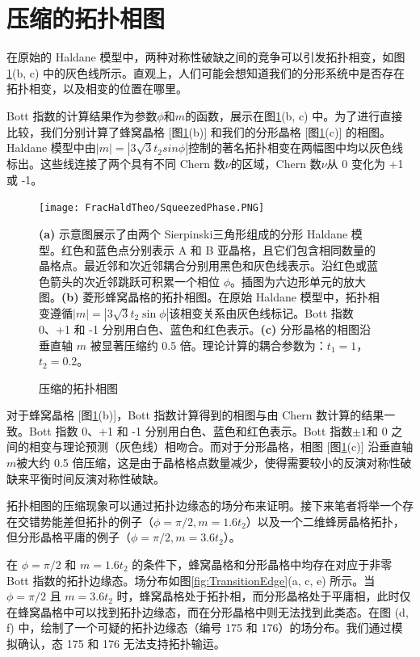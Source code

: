 \section{压缩的拓扑相图}
在原始的 Haldane 模型中，两种对称性破缺之间的竞争可以引发拓扑相变，如图 \ref{fig:SqueezedPhase}(b, c) 中的灰色线所示。直观上，人们可能会想知道我们的分形系统中是否存在拓扑相变，以及相变的位置在哪里。

Bott 指数的计算结果作为参数$\phi$和$m$的函数，展示在图\ref{fig:SqueezedPhase}(b, c) 中。为了进行直接比较，我们分别计算了蜂窝晶格 [图\ref{fig:SqueezedPhase}(b)] 和我们的分形晶格 [图\ref{fig:SqueezedPhase}(c)] 的相图。Haldane 模型中由$|m|=|3\sqrt{3}t_2sin\phi|$控制的著名拓扑相变在两幅图中均以灰色线标出。这些线连接了两个具有不同 Chern 数$\nu$的区域，Chern 数$\nu$从 0 变化为 +1 或 -1。

\begin{figure}[htbp]
    \centering
    \texttt{[image: FracHaldTheo/SqueezedPhase.PNG]}
    \caption{压缩的拓扑相图}\textbf{(a)} 示意图展示了由两个 Sierpinski三角形组成的分形 Haldane 模型。红色和蓝色点分别表示 A 和 B 亚晶格，且它们包含相同数量的晶格点。最近邻和次近邻耦合分别用黑色和灰色线表示。沿红色或蓝色箭头的次近邻跳跃可积累一个相位 $\phi$。插图为六边形单元的放大图。\textbf{(b)} 菱形蜂窝晶格的拓扑相图。在原始 Haldane 模型中，拓扑相变遵循$|m| = |3\sqrt{3} t_2 \sin \phi|$该相变关系由灰色线标记。Bott 指数 0、+1 和 -1 分别用白色、蓝色和红色表示。\textbf{(c)} 分形晶格的相图沿垂直轴 $m$ 被显著压缩约 0.5 倍。理论计算的耦合参数为：$t_1 = 1$，$t_2 = 0.2$。
    \label{fig:SqueezedPhase}
\end{figure}

对于蜂窝晶格 [图\ref{fig:SqueezedPhase}(b)]，Bott 指数计算得到的相图与由 Chern 数计算的结果一致。Bott 指数 0、+1 和 -1 分别用白色、蓝色和红色表示。Bott 指数$\pm1$和 0 之间的相变与理论预测（灰色线）相吻合。而对于分形晶格，相图 [图\ref{fig:SqueezedPhase}(c)] 沿垂直轴$m$被大约 0.5 倍压缩，这是由于晶格格点数量减少，使得需要较小的反演对称性破缺来平衡时间反演对称性破缺。

拓扑相图的压缩现象可以通过拓扑边缘态的场分布来证明。接下来笔者将举一个存在交错势能差但拓扑的例子（$\phi = \pi/2, m = 1.6t_2$）以及一个二维蜂房晶格拓扑，但分形晶格平庸的例子（$\phi = \pi/2, m = 3.6t_2$）。

在 $\phi = \pi/2$ 和 $m = 1.6t_2$ 的条件下，蜂窝晶格和分形晶格中均存在对应于非零 Bott 指数的拓扑边缘态。场分布如图\ref{fig:TransitionEdge}(a, c, e) 所示。当 $\phi = \pi/2$ 且 $m = 3.6t_2$ 时，蜂窝晶格处于拓扑相，而分形晶格处于平庸相，此时仅在蜂窝晶格中可以找到拓扑边缘态，而在分形晶格中则无法找到此类态。在图 (d, f) 中，绘制了一个可疑的拓扑边缘态（编号 175 和 176）的场分布。我们通过模拟确认，态 175 和 176 无法支持拓扑输运。

